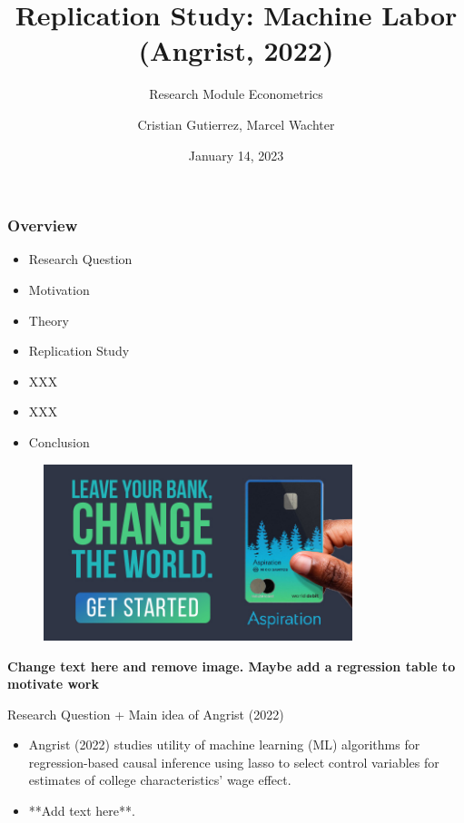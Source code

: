 \documentclass{beamer}
\title{Replication Study: Machine Labor (Angrist, 2022)}
\subtitle {Research Module Econometrics}
\author{Cristian Gutierrez, Marcel Wachter}
\date{January 14, 2023}
\begin{document}
\maketitle

\begin{frame}
\frametitle{Overview} 

\begin{itemize}
    

\item Research Question
\item Motivation
\item Theory
\item Replication Study
\item XXX
\item XXX
\item Conclusion
\end{itemize}
\end{frame}


\begin{frame}{}

\begin{itemize}

\begin{figure}[htp]
    \centering
    \includegraphics[width=9cm]{cover2.jpg}
    
\end{figure}


 \centering   \textbf{Change text here and remove image. Maybe add a regression table to motivate work}

    


\end{itemize}
\end{frame}

\begin{frame} {Research Question + Main idea of Angrist (2022)}
\begin{itemize}

\item  Angrist (2022) studies utility of machine learning (ML) algorithms for regression-based causal inference using lasso to select control variables for estimates of college characteristics' wage effect.
\item **Add text here**.
\end{itemize}

\end{frame}
\end{document}
